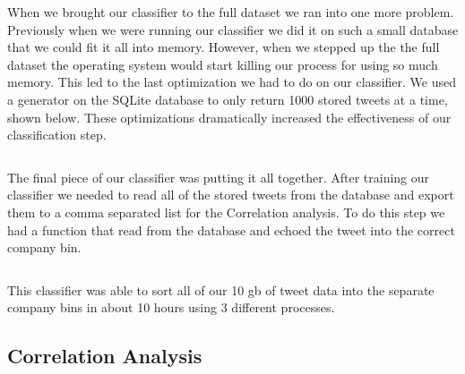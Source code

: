 \documentclass{acm_proc_article-sp}
\begin{document}
When we brought our classifier to the full dataset we ran into one more
problem.  Previously when we were running our classifier we did it on such a
small database that we could fit it all into memory. However, when we stepped
up the the full dataset the operating system would start killing our process
for using so much memory. This led to the last optimization we had to do on our
classifier. We used a generator on the SQLite database to only return 1000
stored tweets at a time, shown below. These optimizations dramatically
increased the effectiveness of our classification step.

\inputminted{python}{examples/generator.py}

The final piece of our classifier was putting it all together. After training
our classifier we needed to read all of the stored tweets from the database and
export them to a comma separated list for the Correlation analysis. To do this
step we had a function that read from the database and echoed the tweet into
the correct company bin.

\inputminted{python}{examples/converter.py}

This classifier was able to sort all of our 10 gb of tweet data into the
separate company bins in about 10 hours using 3 different processes. 

\subsection{Correlation Analysis}
\end{document}
